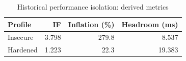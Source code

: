 \begin{table}[t]
\caption{Historical performance isolation: derived metrics}
\label{tab:derived}
\centering\small
\begin{tabular}{lrrr}
\toprule
Profile & IF & Inflation (\%) & Headroom (ms) \\
\midrule
Insecure & 3.798 & 279.8 & 8.537 \\
Hardened & 1.223 & 22.3 & 19.383 \\
\bottomrule
\end{tabular}
\end{table}
